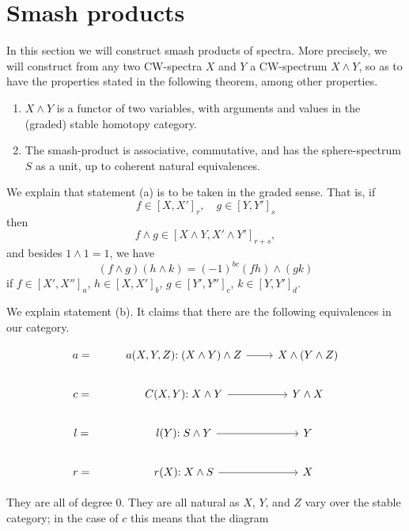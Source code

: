 \documentclass[../main]{subfiles}
\begin{document}

\chapter{Smash products}
\label{sec:p3c04}
    In this section we will construct smash products of spectra.
More precisely, we will construct from any two CW-spectra $X$ and $Y$ a CW-spectrum $X \wedge Y$, so as to have the properties stated in the following theorem, among other properties.
\begin{theorem}\label{thm:p3c04.1}
    \begin{enumerate}[label=(\alph*)] 
        \item $X \wedge Y$ is a functor of two variables, with arguments and values in the (graded) stable homotopy category.
        \item The smash-product is associative, commutative, and has the sphere-spectrum $S$ as a unit, up to coherent natural equivalences.
    \end{enumerate}
\end{theorem}

We explain that statement (a) is to be taken in the graded sense.
That is, if
\[
    f \in [X, X']_r, \quad g \in [Y, Y']_s
\]
then
\[
    f \wedge g \in [X \wedge Y, X' \wedge Y']_{r + s},
\]
and besides $1 \wedge 1 = 1$, we have
\[
    (f \wedge g) (h \wedge k) = (-1)^{bc} (fh) \wedge (gk)
\]
if $f \in [X', X'']_{a}$, $h \in [X, X']_b$, $g \in [Y', Y'']_c$, $k \in [Y, Y']_d$.

We explain statement (b).
It claims that there are the following equivalences in our category.

\[\begin{tikzcd}
	{a=} & {a(X,Y,Z)} {:(X\wedge Y)\wedge Z} & {X\wedge(Y\wedge Z)} \\
	{c=} & {C(X,Y)} {:X\wedge Y} & {Y\wedge X} \\
	{l=} & {l(Y)} {:S\wedge Y} & Y \\
	{r=} & {r(X)}  {:X\wedge S} & X
	\arrow[from=1-2, to=1-3]
	\arrow[from=2-2, to=2-3]
	\arrow[from=3-2, to=3-3]
	\arrow[from=4-2, to=4-3]
\end{tikzcd}\]

They are all of degree 0.
They are all natural as $X$, $Y$, and $Z$ vary over the stable category;
in the case of $c$ this means that the diagram
\end{document}
